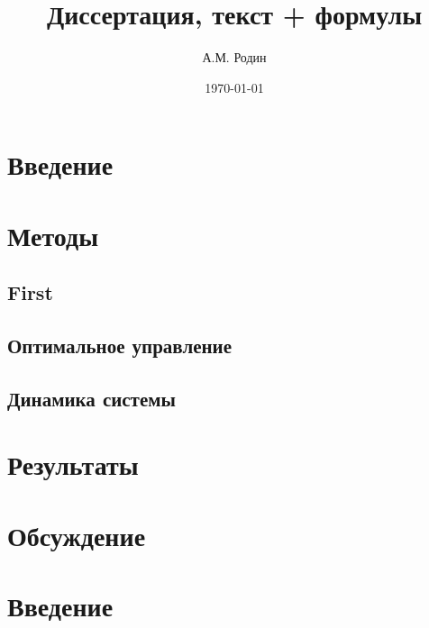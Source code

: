 \documentclass[a4paper,12pt]{article}
\author{А.М. Родин} %
\title{ Диссертация, текст  + формулы}  %
\date{\today} %
\begin{document}
\maketitle

\section{Введение}
\section{Методы}
\subsection{First}
\subsection{Оптимальное управление}
\subsection{Динамика системы}

\section{Результаты}
\section{Обсуждение}
\section{Введение}
\end{document}
